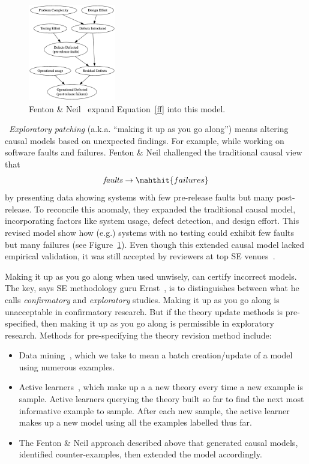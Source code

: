 \documentclass[]{svjour3}
\begin{document}
  
 \begin{figure}
\includegraphics[width=1.5in]{fenton.png}
\caption{    Fenton \& Neil~\cite{Fenton2000SoftwareMR} expand Equation~\ref{ff} into this model. }\label{fenton}
\end{figure} 
~{\em Exploratory  patching} (a.k.a. ``making it up as you go along'')  means altering  causal models based on unexpected findings. 
For example, while working on   software faults and failures.
Fenton \& Neil challenged the  traditional causal view that
\begin{equation}\label{ff}
\mathit{faults} \rightarrow \mahthit{failures}
\end{equation}
by presenting data showing systems with few pre-release faults but
many post-release. To reconcile this anomaly, they expanded the traditional  causal model, incorporating factors like system usage, defect detection, and design effort. This revised model show how (e.g.) systems with no testing could exhibit few faults but many failures
(see Figure~\ref{fenton}). Even though this extended causal model lacked empirical validation, it was still accepted by reviewers at top SE venues~\cite{fenton1999critique,Fenton2000SoftwareMR}.


Making it up as you go along
when used unwisely,   can   certify incorrect models.  
The key, says SE methodology guru Ernst~\cite{Ernst2023}, is to  distinguishes between what he calls
{\em confirmatory} and {\em exploratory} studies. Making it up as you go along is unacceptable in confirmatory research. But if the  
 theory update methods is pre-specified, then making it up as you go along is  permissible in exploratory research.
Methods for pre-specifying the theory revision  method include:
\begin{itemize}
\item
Data mining~\cite{witten2002data}, which we take to mean a batch creation/update
of a model using numerous examples. 
\item Active learners~\cite{senthilkumar2024largelanguagemodelsimprove}, which make up a  a new theory every time a new example is sample.  Active learners querying the theory built so far to find the next most informative example to sample. After each new sample, the active learner makes up a new model using all the examples labelled thus far.
\item 
The Fenton \& Neil approach described above  that generated causal models, identified counter-examples, then extended the model accordingly. 
\end{itemize}
\end{document}
